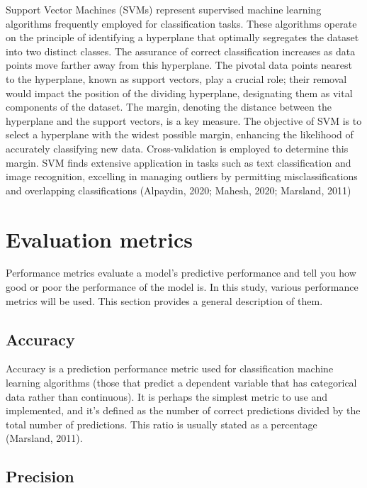 \documentclass[
  jou]{apa6}
\begin{document}
Support Vector Machines (SVMs) represent supervised machine learning algorithms frequently employed for classification tasks.
These algorithms operate on the principle of identifying a hyperplane that optimally segregates the dataset into two distinct classes.
The assurance of correct classification increases as data points move farther away from this hyperplane.
The pivotal data points nearest to the hyperplane, known as support vectors, play a crucial role; their removal would impact the position of the dividing hyperplane, designating them as vital components of the dataset.
The margin, denoting the distance between the hyperplane and the support vectors, is a key measure.
The objective of SVM is to select a hyperplane with the widest possible margin, enhancing the likelihood of accurately classifying new data.
Cross-validation is employed to determine this margin.
SVM finds extensive application in tasks such as text classification and image recognition, excelling in managing outliers by permitting misclassifications and overlapping classifications (Alpaydin, 2020; Mahesh, 2020; Marsland, 2011)

\hypertarget{evaluation-metrics}{%
\section{Evaluation metrics}\label{evaluation-metrics}}

Performance metrics evaluate a model's predictive performance and tell you how good or poor the performance of the model is.
In this study, various performance metrics will be used.
This section provides a general description of them.

\hypertarget{accuracy}{%
\subsection{Accuracy}\label{accuracy}}

Accuracy is a prediction performance metric used for classification machine learning algorithms (those that predict a dependent variable that has categorical data rather than continuous).
It is perhaps the simplest metric to use and implemented, and it's defined as the number of correct predictions divided by the total number of predictions.
This ratio is usually stated as a percentage (Marsland, 2011).

\hypertarget{precision}{%
\subsection{Precision}\label{precision}}
\end{document}
